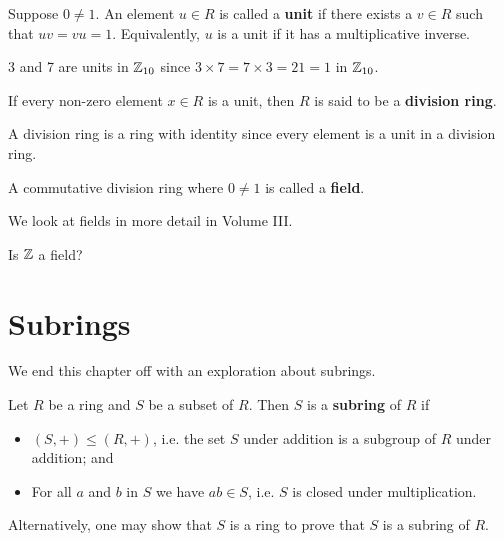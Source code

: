 \begin{definition}
    Suppose $0 \neq 1$. An element $u \in R$ is called a \textbf{unit} if there exists a $v \in R$ such that $uv=vu=1$. Equivalently, $u$ is a unit if it has a multiplicative inverse.
\end{definition}
\begin{example}
    3 and 7 are units in $\mathbb{Z}_{10}$ since $3 \times 7 = 7 \times 3 = 21 = 1$ in $\mathbb{Z}_{10}$.
\end{example}

\begin{definition}
    If every non-zero element $x \in R$ is a unit, then $R$ is said to be a \textbf{division ring}.
\end{definition}
\begin{remark}
    A division ring is a ring with identity since every element is a unit in a division ring.
\end{remark}

\begin{definition}
    A commutative division ring where $0 \neq 1$ is called a \textbf{field}.
\end{definition}
We look at fields in more detail in Volume III.

\begin{exercise}\label{exercise-Z-is-not-a-field}
    Is $\mathbb{Z}$ a field?
\end{exercise}

\newpage

\section{Subrings}
We end this chapter off with an exploration about subrings.

\begin{definition}
    Let $R$ be a ring and $S$ be a subset of $R$. Then $S$ is a \textbf{subring} of $R$ if
    \begin{itemize}
        \item $(S, +) \leq (R, +)$, i.e. the set $S$ under addition is a subgroup of $R$ under addition; and
        \item For all $a$ and $b$ in $S$ we have $ab \in S$, i.e. $S$ is closed under multiplication.
    \end{itemize}
\end{definition}
\begin{remark}
    Alternatively, one may show that $S$ is a ring to prove that $S$ is a subring of $R$.
\end{remark}

